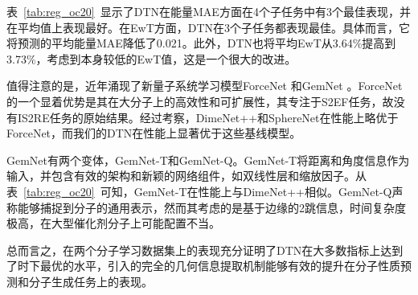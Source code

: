 表~\ref{tab:reg_oc20}~显示了DTN在能量MAE方面在4个子任务中有3个最佳表现，并在平均值上表现最好。在EwT方面，DTN在3个子任务都表现最佳。具体而言，它将预测的平均能量MAE降低了0.021。此外，DTN也将平均EwT从3.64\%提高到3.73\%，考虑到本身较低的EwT值，这是一个很大的改进。

值得注意的是，近年涌现了新量子系统学习模型ForceNet \cite{forcenet_hu_21} 和GemNet \cite{gemnet_gasteiger_21}。ForceNet的一个显着优势是其在大分子上的高效性和可扩展性，其专注于S2EF任务，故没有IS2RE任务的原始结果。经过考察，DimeNet++和SphereNet在性能上略优于ForceNet，而我们的DTN在性能上显著优于这些基线模型。

GemNet有两个变体，GemNet-T和GemNet-Q。GemNet-T将距离和角度信息作为输入，并包含有效的架构和新颖的网络组件，如双线性层和缩放因子。从表~\ref{tab:reg_oc20}~可知，GemNet-T在性能上与DimeNet++相似。GemNet-Q声称能够捕捉到分子的通用表示，然而其考虑的是基于边缘的2跳信息，时间复杂度极高，在大型催化剂分子上可能配置不当。

总而言之，在两个分子学习数据集上的表现充分证明了DTN在大多数指标上达到了时下最优的水平，引入的完全的几何信息提取机制能够有效的提升在分子性质预测和分子生成任务上的表现。